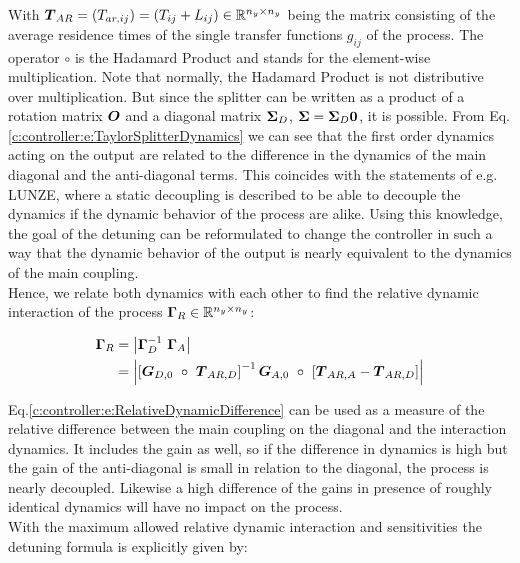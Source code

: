 With $\mbox{\boldmath$T$}_{AR} = (T_{ar,ij}) = (T_{ij} + L_{ij})\in \mathbb{R}^{n_y \times n_y}$ being the matrix consisting of the average residence times of the single transfer functions $g_{ij}$ of the process. The operator $\circ$ is the Hadamard Product and stands for the element-wise multiplication. Note that normally, the Hadamard Product is not distributive over multiplication. But since the splitter can be written as a product of a rotation matrix $\mbox{\boldmath$O$}$ and a diagonal matrix $\mbox{\boldmath$\Sigma$}_D$, $\mbox{\boldmath$\Sigma$} = \mbox{\boldmath$\Sigma$}_D \mbox{\boldmath$0$} $, it is possible. From Eq. \ref{c:controller:e:TaylorSplitterDynamics} we can see that the first order dynamics acting on the output are related to the difference in the dynamics of the main diagonal and the anti-diagonal terms. This coincides with the statements of e.g. LUNZE, where a static decoupling is described to be able to decouple the dynamics if the dynamic behavior of the process are alike. Using this knowledge, the goal of the detuning can be reformulated to change the controller in such a way that the dynamic behavior of the output is nearly equivalent to the dynamics of the main coupling. \\

Hence, we relate both dynamics with each other to find the relative dynamic interaction of the process $\mbox{\boldmath$\Gamma$}_R \in \mathbb{R}^{n_y \times n_y}$:

\begin{align}
\begin{split}
\mbox{\boldmath$\Gamma$}_R &= \left| \mbox{\boldmath$\Gamma$}_D^{-1}~\mbox{\boldmath$\Gamma$}_A  \right|\\
&= \left| \left[\mbox{\boldmath$G$}_{D,0}~\circ~\mbox{\boldmath$T$}_{AR,D}\right]^{-1} \mbox{\boldmath$G$}_{A,0}~\circ~\left[ \mbox{\boldmath$T$}_{AR,A} - \mbox{\boldmath$T$}_{AR,D}\right] \right|
\end{split}
\label{c:controller:e:RelativeDynamicDifference}
\end{align}

Eq.\ref{c:controller:e:RelativeDynamicDifference} can be used as a measure of the relative difference between the main coupling on the diagonal and the interaction dynamics. It includes the gain as well, so if the difference in dynamics is high but the gain of the anti-diagonal is small in relation to the diagonal, the process is nearly decoupled. Likewise a high difference of the gains in presence of roughly identical dynamics will have no impact on the process.\\

With the maximum allowed relative dynamic interaction and sensitivities the detuning formula is explicitly given by:

